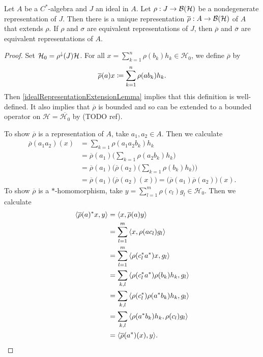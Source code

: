 \begin{proposition}
Let $A$ be a $C^*$-algebra and $J$ an ideal in $A$. Let $\rho: J\to \operatorname{\mathcal{B}}(\mathcal{H})$ be a nondegenerate representation of $J$. Then there is a unique representation $\overline{\rho}: A\to \operatorname{\mathcal{B}}(\mathcal{H})$ of $A$ that extends $\rho$. If $\rho$ and $\sigma$ are equivalent representations of $J$, then $\overline{\rho}$ and $\overline{\sigma}$ are equivalent representations of $A$.
\end{proposition}
\begin{proof}
Set $\mathcal{H}_0 = \rho^\downarrow(J)\mathcal{H}$. For all $x = \sum_{k=1}^n\rho(b_k)h_k\in \mathcal{H}_0$, we define $\overline{\rho}$ by
\[ \overline{\rho}(a)x \coloneqq \sum_{k=1}^n\rho(ab_k)h_k. \]
Then \ref{idealRepresentationExtensionLemma} implies that this definition is well-defined. It also implies that $\overline{\rho}$ is bounded and so can be extended to a bounded operator on $\mathcal{H} = \overline{\mathcal{H}_0}$ by (TODO ref).

To show $\overline{\rho}$ is a representation of $A$, take $a_1,a_2\in A$. Then we calculate
\begin{align*}
\overline{\rho}(a_1a_2)(x) &= \sum_{k=1}\rho(a_1a_2b_k)h_k \\
&= \overline{\rho}(a_1)\big(\sum_{k=1}\rho(a_2b_k)h_k\big) \\
&= \overline{\rho}(a_1)\Big(\overline{\rho}(a_2)\big(\sum_{k=1}\rho(b_k)h_k\big)\Big) \\
&= \overline{\rho}(a_1)\big(\overline{\rho}(a_2)(x)\big) = \big(\overline{\rho}(a_1)\overline{\rho}(a_2)\big)(x).
\end{align*}
To show $\overline{\rho}$ is a $*$-homomorphism, take $y = \sum_{l=1}^m \rho(c_l)g_l \in \mathcal{H}_0$. Then we calculate
\begin{align*}
\inner{\overline{\rho}(a)^*x, y} &= \inner{x, \overline{\rho}(a)y} \\
&= \sum_{l=1}^m\inner{x, \rho(ac_l)g_l} \\
&= \sum_{l=1}^m\inner{\rho(c_l^*a^*)x, g_l} \\
&= \sum_{k,l}\inner{\rho(c_l^*a^*)\rho(b_k)h_k, g_l} \\
&= \sum_{k,l}\inner{\rho(c_l^*)\rho(a^*b_k)h_k, g_l} \\
&= \sum_{k,l}\inner{\rho(a^*b_k)h_k, \rho(c_l)g_l} \\
&= \inner{\overline{\rho}(a^*)(x), y}.
\end{align*}


\end{proof}
